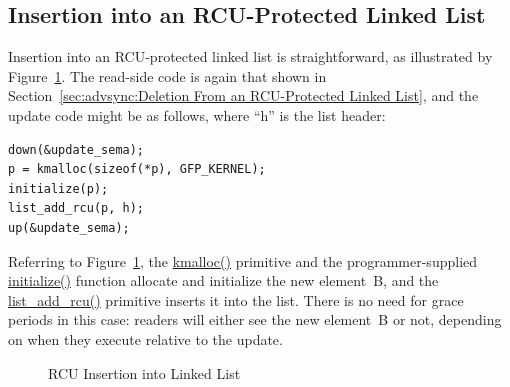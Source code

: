 \subsection{Insertion into an RCU-Protected Linked List}
\label{sec:advsync:Insertion into an RCU-Protected Linked List}

Insertion into an RCU-protected linked list is straightforward, as
illustrated by
Figure~\ref{fig:advsync:RCU Insertion into Linked List}.
The read-side code is again that shown in
Section~\ref{sec:advsync:Deletion From an RCU-Protected Linked List},
and the update code might be as follows, where ``h'' is the list header:

\vspace{5pt}
\begin{minipage}[t]{\columnwidth}
\begin{verbatim}
down(&update_sema);
p = kmalloc(sizeof(*p), GFP_KERNEL);
initialize(p);
list_add_rcu(p, h);
up(&update_sema);
\end{verbatim}
\end{minipage}
\vspace{5pt}

Referring to
Figure~\ref{fig:advsync:RCU Insertion into Linked List},
the \url{kmalloc()} primitive and the programmer-supplied \url{initialize()}
function allocate and initialize the new element~B,
and the \url{list_add_rcu()} primitive inserts it into the list.
There is no need for grace periods in this case: readers will either
see the new element~B or not, depending on when they execute relative
to the update.

\begin{figure}[htb]
\begin{center}
\end{center}
\caption{RCU Insertion into Linked List}
\label{fig:advsync:RCU Insertion into Linked List}
\end{figure}

